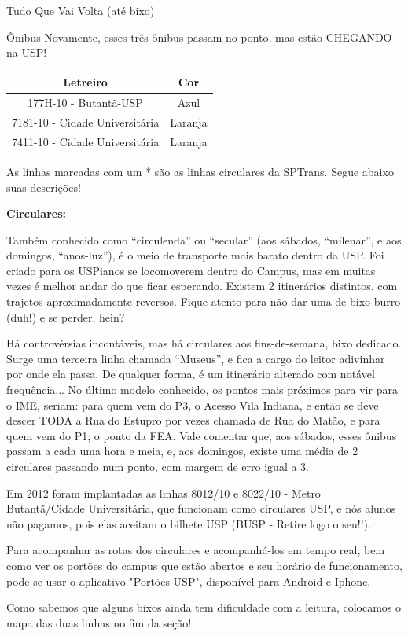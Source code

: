 \begin{secao}{Tudo Que Vai Volta (até bixo)}
\begin{subsecao}{Ônibus}
Novamente, esses três ônibus passam no ponto, mas estão CHEGANDO na USP!
\begin{center}
	\begin{tabular}{|c|c|}
	  \hline
	  Letreiro & Cor\\
	  \hline
	  177H-10 - Butantã-USP & Azul\\
	  7181-10 - Cidade Universitária & Laranja\\
	  7411-10 - Cidade Universitária & Laranja\\
	  \hline
	\end{tabular}
\end{center}

As linhas marcadas com um * são as linhas circulares da SPTrans. Segue abaixo suas descrições!

{\bf Circulares:}

Também conhecido como ``circulenda'' ou ``secular'' (aos sábados, ``milenar'', e aos domingos, ``anos-luz''), é o meio de transporte mais barato dentro da USP. Foi criado para os USPianos se locomoverem dentro do Campus, mas em muitas vezes é melhor andar do que ficar esperando. Existem 2 itinerários distintos, com trajetos aproximadamente reversos. Fique atento para não dar uma de bixo burro (duh!) e se perder, hein? 

Há controvérsias incontáveis, mas há circulares aos fins-de-semana, bixo dedicado. Surge uma terceira linha chamada “Museus”, e fica a cargo do leitor adivinhar por onde ela passa. De qualquer forma, é um itinerário alterado com notável frequência... No último modelo conhecido, os pontos mais próximos para vir para o IME, seriam: para quem vem do P3, o Acesso Vila Indiana, e então se deve descer TODA a Rua do Estupro por vezes chamada de Rua do Matão, e para quem vem do P1, o ponto da FEA. Vale comentar que, aos sábados, esses ônibus passam a cada uma hora e meia, e, aos domingos, existe uma média de 2 circulares passando num ponto, com margem de erro igual a 3. 

Em 2012 foram implantadas as linhas 8012/10 e 8022/10 - Metro Butantã/Cidade Universitária,
que funcionam como circulares USP, e nós alunos não pagamos, pois elas aceitam o bilhete USP (BUSP - Retire logo o seu!!).

Para acompanhar as rotas dos circulares e acompanhá-los em tempo real, bem como
ver os portões do campus que estão abertos e seu horário de funcionamento, pode-se
usar o aplicativo "Portões USP", disponível para Android e Iphone.

Como sabemos que alguns bixos ainda tem dificuldade com a leitura, colocamos o
 mapa das duas linhas no fim da seção!



\end{subsecao}
\end{secao}
